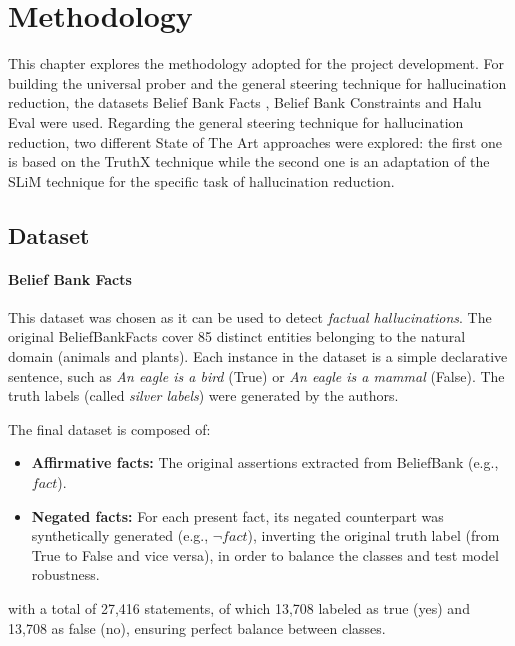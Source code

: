 \chapter{Methodology}


This chapter explores the methodology adopted for the project development. For building the universal prober and the general steering technique for hallucination reduction, the datasets Belief Bank Facts \cite{BeliefBank}, Belief Bank Constraints \cite{BeliefBank} and Halu Eval \cite{Halueval} were used.
Regarding the general steering technique for hallucination reduction, two different State of The Art approaches were explored: the first one is based on the TruthX \cite{TruthX} technique while the second one is an adaptation of the SLiM \cite{SLiM} technique for the specific task of hallucination reduction.


\section{Dataset}


\subsubsection{Belief Bank Facts}
This dataset was chosen as it can be used to detect \textit{factual hallucinations}.
The original BeliefBankFacts cover 85 distinct entities belonging to the natural domain (animals and plants). Each instance in the dataset is a simple declarative sentence, such as \textit{An eagle is a bird} (True) or \textit{An eagle is a mammal} (False).
The truth labels (called \textit{silver labels}) were generated by the authors. 

The final dataset is composed of:
\begin{itemize}
    \item \textbf{Affirmative facts:} The original assertions extracted from BeliefBank (e.g., $fact$).
    \item \textbf{Negated facts:} For each present fact, its negated counterpart was synthetically generated (e.g., $\neg fact$), inverting the original truth label (from True to False and vice versa), in order to balance the classes and test model robustness.
\end{itemize}

with a total of 27,416 statements, of which 13,708 labeled as true (yes) and 13,708 as false (no), ensuring perfect balance between classes.


